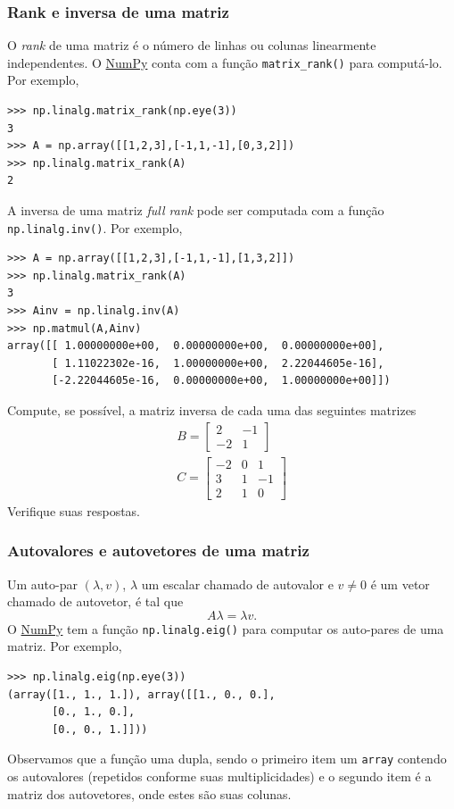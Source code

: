\documentclass[12pt]{article}
\begin{document}
\subsubsection{Rank e inversa de uma matriz}

O \emph{rank} de uma matriz é o número de linhas ou colunas linearmente independentes. O \href{https://numpy.org/}{NumPy} conta com a função \lstinline+matrix_rank()+ para computá-lo. Por exemplo,
\begin{lstlisting}
>>> np.linalg.matrix_rank(np.eye(3))
3
>>> A = np.array([[1,2,3],[-1,1,-1],[0,3,2]])
>>> np.linalg.matrix_rank(A)
2
\end{lstlisting}

A inversa de uma matriz \emph{full rank} pode ser computada com a função \lstinline+np.linalg.inv()+. Por exemplo,
\begin{lstlisting}
>>> A = np.array([[1,2,3],[-1,1,-1],[1,3,2]])
>>> np.linalg.matrix_rank(A)
3
>>> Ainv = np.linalg.inv(A)
>>> np.matmul(A,Ainv)
array([[ 1.00000000e+00,  0.00000000e+00,  0.00000000e+00],
       [ 1.11022302e-16,  1.00000000e+00,  2.22044605e-16],
       [-2.22044605e-16,  0.00000000e+00,  1.00000000e+00]])
\end{lstlisting}

\begin{exr}
  Compute, se possível, a matriz inversa de cada uma das seguintes matrizes
  \begin{gather}
    B =
    \begin{bmatrix}
      2 & -1\\
      -2 & 1
    \end{bmatrix}\\
    C =
    \begin{bmatrix}
      -2 & 0 & 1\\
      3 & 1 & -1\\
      2 & 1 & 0
    \end{bmatrix}
  \end{gather}
  Verifique suas respostas.
\end{exr}

\subsubsection{Autovalores e autovetores de uma matriz}

Um auto-par $(\lambda, v)$, $\lambda$ um escalar chamado de autovalor e $v\neq 0$ é um vetor chamado de autovetor, é tal que
\begin{equation}
  A\lambda = \lambda v.
\end{equation}
O \href{https://numpy.org/}{NumPy} tem a função \lstinline+np.linalg.eig()+ para computar os auto-pares de uma matriz. Por exemplo,
\begin{lstlisting}
>>> np.linalg.eig(np.eye(3))
(array([1., 1., 1.]), array([[1., 0., 0.],
       [0., 1., 0.],
       [0., 0., 1.]]))
\end{lstlisting}
Observamos que a função uma dupla, sendo o primeiro item um \lstinline+array+ contendo os autovalores (repetidos conforme suas multiplicidades) e o segundo item é a matriz dos autovetores, onde estes são suas colunas.
\end{document}
